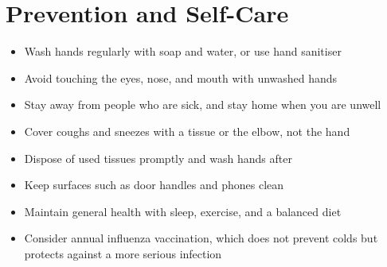 \section*{Prevention and Self-Care}
\begin{itemize}
    \item Wash hands regularly with soap and water, or use hand sanitiser
    \item Avoid touching the eyes, nose, and mouth with unwashed hands
    \item Stay away from people who are sick, and stay home when you are unwell
    \item Cover coughs and sneezes with a tissue or the elbow, not the hand
    \item Dispose of used tissues promptly and wash hands after
    \item Keep surfaces such as door handles and phones clean
    \item Maintain general health with sleep, exercise, and a balanced diet
    \item Consider annual influenza vaccination, which does not prevent colds but protects against a more serious infection
\end{itemize}
